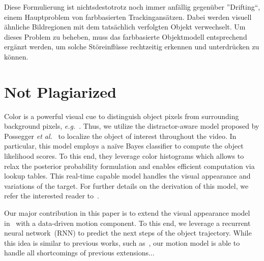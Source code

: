 \documentclass[a4paper,10pt]{article}
\begin{document}
Diese Formulierung ist nichtsdestotrotz noch immer anf\"allig gegen\"uber ''Drifting``, einem Hauptproblem von farbbasierten Trackingans\"atzen.
Dabei werden visuell \"ahnliche Bildregionen mit dem tats\"achlich verfolgten Objekt verwechselt.
Um dieses Problem zu beheben, muss das farbbasierte Objektmodell entsprechend erg\"anzt werden, um solche St\"oreinfl\"usse rechtzeitig erkennen und unterdr\"ucken zu k\"onnen.

\section*{Not Plagiarized}
Color is a powerful visual cue to distinguish object pixels from surrounding background pixels, \emph{e.g.}~\cite{possegger15, raja98a, wang16a}.
Thus, we utilize the distractor-aware model proposed by Possegger \emph{et al.}~\cite{possegger15} to localize the object of interest throughout the video.
In particular, this model employs a na\"ive Bayes classifier to compute the object likelihood scores.
To this end, they leverage color histograms which allows to relax the posterior probability formulation and enables efficient computation via lookup tables.
This real-time capable model handles the visual appearance and variations of the target.
For further details on the derivation of this model, we refer the interested reader to~\cite{possegger15}.

Our major contribution in this paper is to extend the visual appearance model in~\cite{possegger15} with a data-driven motion component.
To this end, we leverage a recurrent neural network~(RNN) to predict the next steps of the object trajectory.
While this idea is similar to previous works, such as~\cite{wang17a}, our motion model is able to handle all shortcomings of previous extensions...


\end{document}
